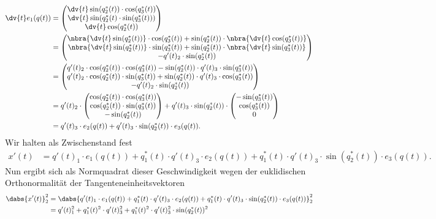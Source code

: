 \documentclass{subfiles}
\begin{document}
        \begin{align*}
            \dv{t} e_1(q(t)) &= \begin{pmatrix}\dv{t} \sin(q_2^*(t))\cdot\cos(q_3^*(t))\\\dv{t} \sin(q_2^*(t)\cdot\sin(q_3^*(t)))\\\dv{t} \cos(q_2^*(t))\end{pmatrix}\\
            &= \begin{pmatrix}\nbra{\dv{t} \sin(q_2^*(t))}\cdot\cos(q_3^*(t)) + \sin(q_2^*(t))\cdot\nbra{\dv{t}\cos(q_3^*(t))}\\\nbra{\dv{t} \sin(q_2^*(t))}\cdot\sin(q_3^*(t)) + \sin(q_2^*(t))\cdot\nbra{\dv{t}\sin(q_3^*(t))}\\-q'(t)_2\cdot \sin(q_2^*(t))\end{pmatrix}\\
            &= \begin{pmatrix}q'(t)_2\cdot\cos(q_2^*(t))\cdot\cos(q_3^*(t)) - \sin(q_2^*(t))\cdot q'(t)_3\cdot\sin(q_3^*(t))\\q'(t)_2\cdot \cos(q_2^*(t))\cdot\sin(q_3^*(t)) + \sin(q_2^*(t))\cdot q'(t)_3\cdot \cos(q_3^*(t))\\-q'(t)_2\cdot \sin(q_2^*(t))\end{pmatrix}\\
            &= q'(t)_2\cdot \begin{pmatrix}\cos(q_2^*(t))\cdot\cos(q_3^*(t))\\ \cos(q_2^*(t))\cdot\sin(q_3^*(t))\\ -\sin(q_2^*(t))\end{pmatrix} 
            + q'(t)_3\cdot\sin(q_2^*(t))\cdot\begin{pmatrix}-\sin(q_3^*(t))\\ \cos(q_3^*(t))\\ 0\end{pmatrix}\\
            &= q'(t)_3\cdot e_2(q(t)) + q'(t)_3\cdot\sin(q_2^*(t))\cdot e_3(q(t)).
        \end{align*}
        Wir halten als Zwischenstand fest 
        \begin{align*}
            x'(t) &= q'(t)_1\cdot e_1(q(t)) + q_1^*(t)\cdot q'(t)_3\cdot e_2(q(t)) + q_1^*(t)\cdot q'(t)_3\cdot\sin(q_2^*(t))\cdot e_3(q(t)).
        \end{align*}
        Nun ergibt sich als Normquadrat dieser Geschwindigkeit wegen der euklidischen Orthonormalität der Tangenteneinheitsvektoren
        \begin{align*}
            \dabs{x'(t)}_2^2 &= \dabs{q'(t)_1\cdot e_1(q(t)) + q_1^*(t)\cdot q'(t)_3\cdot e_2(q(t)) + q_1^*(t)\cdot q'(t)_3\cdot\sin(q_2^*(t))\cdot e_3(q(t))}_2^2\\
            &= q'(t)_1^2 +q_1^*(t)^2\cdot q'(t)_3^2 + q_1^*(t)^2\cdot q'(t)_3^2\cdot\sin(q_2^*(t))^2
        \end{align*}
\end{document}
